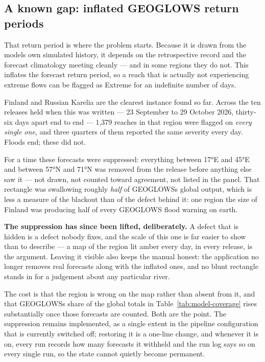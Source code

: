 \subsection{A known gap: inflated GEOGLOWS return periods}\label{withheld-geoglows}


That return period is where the problem starts.
Because it is drawn from the model\textquotesingle s own simulated history, it depends on the retrospective record and the forecast climatology meeting cleanly --- and in some regions they do not.
This inflates the forecast return period, so a reach that is actually not experiencing extreme flows can be flagged as Extreme for an indefinite number of days.

Finland and Russian Karelia are the clearest instance found so far.
Across the ten releases held when this was written --- 23 September to 29 October 2026, thirty-six days apart end to end --- 1,379 reaches in that region were flagged on \emph{every single one}, and three quarters of them reported the same severity every day.
Floods end; these did not.

For a time these forecasts were suppressed: everything between 17°E and 45°E and between 57°N and 71°N was removed from the release before anything else saw it --- not drawn, not counted toward agreement, not listed in the panel.
That rectangle was swallowing roughly \emph{half} of GEOGLOWS\textquotesingle s global output, which is less a measure of the blackout than of the defect behind it: one region the size of Finland was producing half of every GEOGLOWS flood warning on earth.

\textbf{The suppression has since been lifted, deliberately.}
A defect that is hidden is a defect nobody fixes, and the scale of this one is far easier to show than to describe --- a map of the region lit amber every day, in every release, is the argument.
Leaving it visible also keeps the manual honest: the application no longer removes real forecasts along with the inflated ones, and no blunt rectangle stands in for a judgement about any particular river.

The cost is that the region is wrong on the map rather than absent from it, and that GEOGLOWS\textquotesingle s share of the global totals in Table~\ref{tab:model-coverage} rises substantially once those forecasts are counted.
Both are the point.
The suppression remains implemented, as a single extent in the pipeline configuration that is currently switched off; restoring it is a one-line change, and whenever it is on, every run records how many forecasts it withheld and the run log says so on every single run, so the state cannot quietly become permanent.

